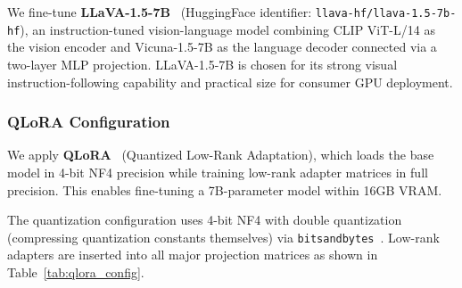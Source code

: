 \documentclass[twocolumn]{article}
\begin{document}
We fine-tune \textbf{LLaVA-1.5-7B}~\cite{liu2024llava} (HuggingFace identifier:
\texttt{llava-hf/llava-1.5-7b-hf}), an instruction-tuned vision-language model
combining CLIP ViT-L/14 as the vision encoder and Vicuna-1.5-7B as the
language decoder connected via a two-layer MLP projection.
LLaVA-1.5-7B is chosen for its strong visual instruction-following capability
and practical size for consumer GPU deployment.

\subsubsection{QLoRA Configuration}

We apply \textbf{QLoRA}~\cite{dettmers2023qlora} (Quantized Low-Rank Adaptation),
which loads the base model in 4-bit NF4 precision while training low-rank adapter
matrices in full precision. This enables fine-tuning a 7B-parameter model within
16GB VRAM.

The quantization configuration uses 4-bit NF4 with double quantization (compressing
quantization constants themselves) via \texttt{bitsandbytes}~\cite{dettmers2022llmint8}.
Low-rank adapters are inserted into all major projection matrices as shown in
Table~\ref{tab:qlora_config}.
\end{document}

